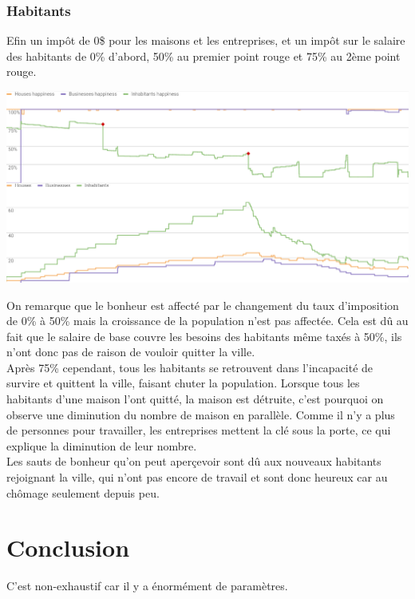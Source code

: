 \documentclass[11pt]{report}
\begin{document}
\subsection{Habitants}
Efin un impôt de 0\$ pour les maisons et les entreprises, et un impôt sur le salaire des habitants de 0\% d'abord, 50\% au premier point rouge et 75\% au 2ème point rouge.
\begin{center}
	\includegraphics[width=\textwidth]{inhabitants_taxes}
\end{center}
On remarque que le bonheur est affecté par le changement du taux d'imposition de 0\% à 50\% mais la croissance de la population n'est pas affectée. Cela est dû au fait que le salaire de base couvre les besoins des habitants même taxés à 50\%, ils n'ont donc pas de raison de vouloir quitter la ville.\\
Après 75\% cependant, tous les habitants se retrouvent dans l'incapacité de survire et quittent la ville, faisant chuter la population. Lorsque tous les habitants d'une maison l'ont quitté, la maison est détruite, c'est pourquoi on observe une diminution du nombre de maison en parallèle. Comme il n'y a plus de personnes pour travailler, les entreprises mettent la clé sous la porte, ce qui explique la diminution de leur nombre.\\
Les sauts de bonheur qu'on peut aperçevoir sont dû aux nouveaux habitants rejoignant la ville, qui n'ont pas encore de travail et sont donc heureux car au chômage seulement depuis peu.



\chapter*{Conclusion}
C'est non-exhaustif car il y a énormément de paramètres.
\end{document}

